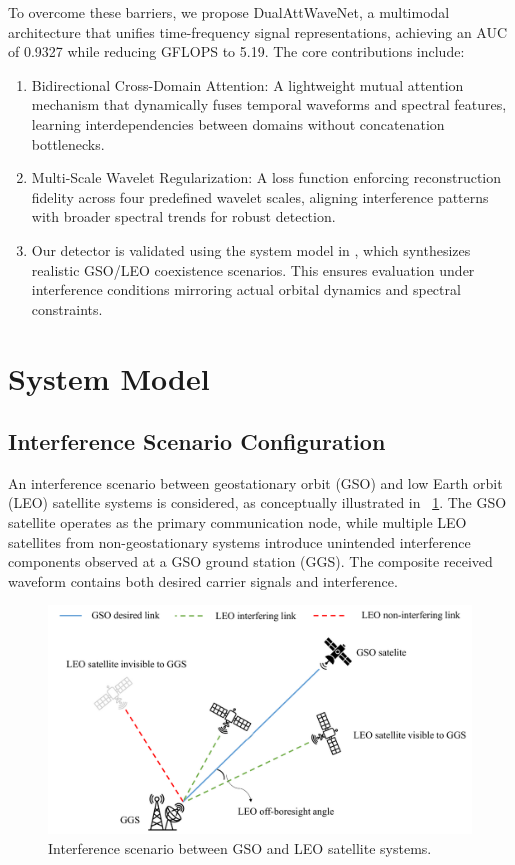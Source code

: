 \documentclass[10pt, conference]{IEEEtran}
\begin{document}
To overcome these barriers, we propose DualAttWaveNet, a multimodal architecture that unifies time-frequency signal representations, achieving an AUC of 0.9327 while reducing GFLOPS to 5.19. The core contributions include:

\begin{enumerate}
    \item Bidirectional Cross-Domain Attention: A lightweight mutual attention mechanism that dynamically fuses temporal waveforms and spectral features, learning interdependencies between domains without concatenation bottlenecks.
    \item Multi-Scale Wavelet Regularization: A loss function enforcing reconstruction fidelity across four predefined wavelet scales, aligning interference patterns with broader spectral trends for robust detection.
    \item Our detector is validated using the system model in \cite{saifaldawlaGenAIBasedModelsNGSO2024}, which synthesizes realistic GSO/LEO coexistence scenarios. This ensures evaluation under interference conditions mirroring actual orbital dynamics and spectral constraints.
\end{enumerate}

\section{System Model}
\label{sec:system_model}

\subsection{Interference Scenario Configuration}
An interference scenario between geostationary orbit (GSO) and low Earth orbit (LEO) satellite systems is considered, as conceptually illustrated in \figurename~\ref{fig:interference-scenario}. The GSO satellite operates as the primary communication node, while multiple LEO satellites from non-geostationary systems introduce unintended interference components observed at a GSO ground station (GGS). The composite received waveform contains both desired carrier signals and interference.

\begin{figure}[tb]
    \centering
    \includegraphics[width=\linewidth]{system-model.pdf}
    \caption{Interference scenario between GSO and LEO satellite systems.}
    \label{fig:interference-scenario}
\end{figure}
\end{document}
